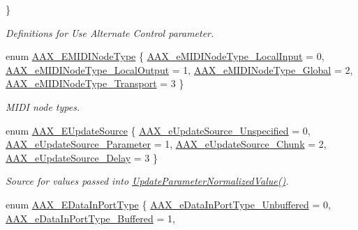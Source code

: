 \begin{DoxyCompactItemize}
 \}
\begin{DoxyCompactList}\small\item\em Definitions for Use Alternate Control parameter. \end{DoxyCompactList}\item 
enum \mbox{\hyperlink{a00491_a5e1dffce35d05990dbbad651702678e4}{A\+A\+X\+\_\+\+E\+M\+I\+D\+I\+Node\+Type}} \{ \mbox{\hyperlink{a00491_a5e1dffce35d05990dbbad651702678e4ae57de2b04978fe2e75f5bdeb034bda44}{A\+A\+X\+\_\+e\+M\+I\+D\+I\+Node\+Type\+\_\+\+Local\+Input}} = 0, 
\mbox{\hyperlink{a00491_a5e1dffce35d05990dbbad651702678e4acc1b5f2109c508b20a65b5e0fdcd643f}{A\+A\+X\+\_\+e\+M\+I\+D\+I\+Node\+Type\+\_\+\+Local\+Output}} = 1, 
\mbox{\hyperlink{a00491_a5e1dffce35d05990dbbad651702678e4a2be91828f8c1dac20ab5dff136fc1fce}{A\+A\+X\+\_\+e\+M\+I\+D\+I\+Node\+Type\+\_\+\+Global}} = 2, 
\mbox{\hyperlink{a00491_a5e1dffce35d05990dbbad651702678e4ac2ff856aec0724907dfd95b8e3ccbc20}{A\+A\+X\+\_\+e\+M\+I\+D\+I\+Node\+Type\+\_\+\+Transport}} = 3
 \}
\begin{DoxyCompactList}\small\item\em M\+I\+DI node types. \end{DoxyCompactList}\item 
enum \mbox{\hyperlink{a00491_a30be0398faf20c6b121239eb9399f3f7}{A\+A\+X\+\_\+\+E\+Update\+Source}} \{ \mbox{\hyperlink{a00491_a30be0398faf20c6b121239eb9399f3f7aec16143f3916bad3c5a6d8eb60600a3b}{A\+A\+X\+\_\+e\+Update\+Source\+\_\+\+Unspecified}} = 0, 
\mbox{\hyperlink{a00491_a30be0398faf20c6b121239eb9399f3f7a401db669e68d5255c1126f7bf183b7ca}{A\+A\+X\+\_\+e\+Update\+Source\+\_\+\+Parameter}} = 1, 
\mbox{\hyperlink{a00491_a30be0398faf20c6b121239eb9399f3f7ab3162148ff1f2c393cd3a03c4479a497}{A\+A\+X\+\_\+e\+Update\+Source\+\_\+\+Chunk}} = 2, 
\mbox{\hyperlink{a00491_a30be0398faf20c6b121239eb9399f3f7a221226f8de93849d1f5bbe773b230a3a}{A\+A\+X\+\_\+e\+Update\+Source\+\_\+\+Delay}} = 3
 \}
\begin{DoxyCompactList}\small\item\em Source for values passed into \mbox{\hyperlink{a01669_a685858711efb8634ce66c327f2865c71}{Update\+Parameter\+Normalized\+Value()}}. \end{DoxyCompactList}\item 
enum \mbox{\hyperlink{a00491_ab5677b173ad8647c24d34d28272d11fc}{A\+A\+X\+\_\+\+E\+Data\+In\+Port\+Type}} \{ \mbox{\hyperlink{a00491_ab5677b173ad8647c24d34d28272d11fca43dc59a68b369ee607f70700bfd02c2d}{A\+A\+X\+\_\+e\+Data\+In\+Port\+Type\+\_\+\+Unbuffered}} = 0, 
\mbox{\hyperlink{a00491_ab5677b173ad8647c24d34d28272d11fcaa9f089bb87161125a38706c81ec522e0}{A\+A\+X\+\_\+e\+Data\+In\+Port\+Type\+\_\+\+Buffered}} = 1, 

\end{DoxyCompactItemize}
